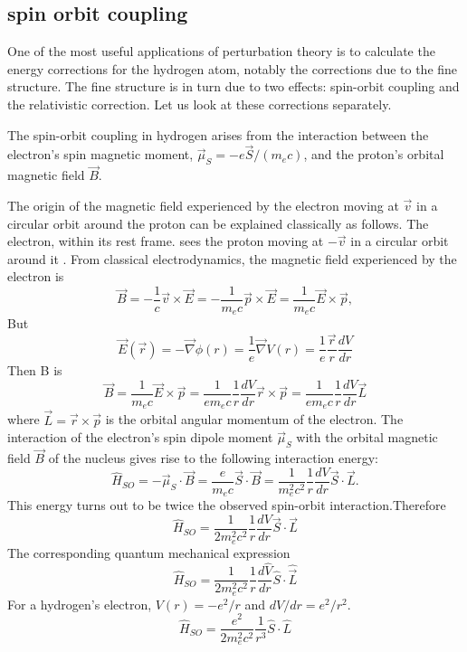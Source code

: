 \subsection{spin orbit coupling}
One of the most useful applications of perturbation theory is to calculate the energy corrections for the hydrogen atom, notably the corrections due to the fine structure. The fine structure is in turn due to two effects: spin-orbit coupling and the relativistic correction. Let us look at these corrections separately.\\
\par The spin-orbit coupling in hydrogen arises from the interaction between the electron's spin magnetic moment, $\vec{\mu}_{S}=-e \vec{S} /\left(m_{e} c\right)$, and the proton's orbital magnetic field $\vec{B}$.

The origin of the magnetic field experienced by the electron moving at $\vec{v}$ in a circular orbit around the proton can be explained classically as follows. The electron, within its rest frame. sees the proton moving at $-\vec{v}$ in a circular orbit around it . From classical electrodynamics, the magnetic field experienced by the electron is
$$
\vec{B}=-\frac{1}{c} \vec{v} \times \vec{E}=-\frac{1}{m_{e} c} \vec{p} \times \vec{E}=\frac{1}{m_{e} c} \vec{E} \times \vec{p},
$$
But $$\vec{E}(\vec{r})=-\vec{\nabla} \phi(r)=\frac{1}{e} \vec{\nabla} V(r)=\frac{1}{e} \frac{\vec{r}}{r} \frac{d V}{d r} $$
Then B is $$\vec{B}=\frac{1}{m_{e} c} \vec{E} \times \vec{p}=\frac{1}{e m_{e} c} \frac{1}{r} \frac{d V}{d r} \vec{r} \times \vec{p}=\frac{1}{e m_{e} c} \frac{1}{r} \frac{d V}{d r} \vec{L}$$
where $\vec{L}=\vec{r} \times \vec{p}$ is the orbital angular momentum of the electron.
The interaction of the electron's spin dipole moment $\vec{\mu}_{S}$ with the orbital magnetic field $\vec{B}$ of the nucleus gives rise to the following interaction energy:
$$
\hat{H}_{S O}=-\vec{\mu}_{S} \cdot \vec{B}=\frac{e}{m_{e} c} \vec{S} \cdot \vec{B}=\frac{1}{m_{e}^{2} c^{2}} \frac{1}{r} \frac{d V}{d r} \vec{S} \cdot \vec{L} .
$$
 This energy turns out to be twice the observed spin-orbit interaction.Therefore \\
 $$\hat{H}_{S O}=\frac{1}{2 m_{e}^{2} c^{2}} \frac{1}{r} \frac{d V}{d r} \vec{S} \cdot \vec{L}$$
 The corresponding quantum mechanical expression \\
 $$\hat{H}_{S O}=\frac{1}{2 m_{e}^{2} c^{2}} \frac{1}{r} \frac{d \hat{V}}{d r} \hat{S} \cdot \hat{\vec{L}}$$
For a hydrogen's electron, $V(r)=-e^{2} / r$ and $d V / d r=e^{2} / r^{2}$.
$$
\hat{H}_{S O}=\frac{e^{2}}{2 m_{e}^{2} c^{2}} \frac{1}{r^{3}} \hat{S} \cdot \hat{L}
$$
